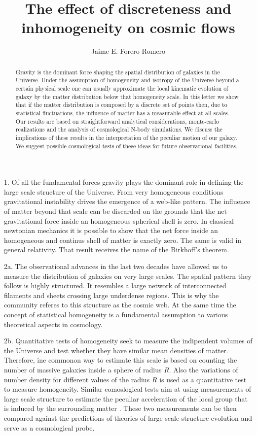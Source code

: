 \documentclass{article}
\title{The effect of discreteness and inhomogeneity on cosmic flows}
\author{Jaime E. Forero-Romero}
\begin{document}
\maketitle
\begin{abstract}

Gravity is the dominant force shaping the spatial distribution of galaxies in
the Universe. Under the assumption of homogeneity and isotropy of the Universe
beyond a certain physical scale one can usually approximate the local
kinematic evolution of galaxy by the matter distribution below that
homogeneity scale. In this letter we show that if the matter
distribution is composed by a discrete set of points then, due to
statistical fluctuations, the influence of matter has a measurable
effect at all scales. Our results are based on straightforward
analytical considerations, monte-carlo realizations and the analysis
of cosmological N-body simulations. We discuss the implications of
these results in the interpretation of the peculiar motion of our
galaxy. We suggest possible cosmological tests of these ideas for
future observational facilities. 



\end{abstract}

1. Of all the fundamental forces gravity plays the dominant role in
defining the large scale structure of the Universe. From very
homogeneous conditions gravitational instability drives the emergence
of a web-like pattern. The influence of
matter beyond that scale can be discarded on the grounds that
the net gravitational force inside an homogeneous spherical
shell is zero. In classical newtonian mechanics it is possible to show
that the net force inside an homogeneous and continus shell of matter
is exactly zero. The same is valid in general relativity. That result
receives the name of the Birkhoff's theorem. 

2a. The observational advances in the last two decades have allowed us
to measure the distribution of galaxies on very large scales. The
spatial pattern they follow is highly structured. It resembles a
large network of interconnected filaments and sheets crossing large
underdense regions.  This is why the community referes to this
structure as the cosmic web. At the same time the concept of
statistical homogeneity is a fundamental assumption to various
theoretical aspects in cosmology. 

2b. Quantitative tests of homogeneity seek to measure the indipendent
volumes of the Universe and test whether they have similar mean
densities of matter. Therefore, ine commonon way to estimate this
scale is based on counting the number of massive galaxies inside a
sphere of radius $R$. Also the variations of number density for
different values of the radius $R$ is used as a quantitative test to
measure homogeneity\cite{2005ApJ...624...54H}. 
Similar comoslogical tests aim at using measurements of large scale
structure to estimate the peculiar acceleration of the local group
that is induced by the surrounding matter
\cite{Gibelyou2012,Bilicki2012}. These two measurements can be then
compared against the predictions of theories of large scale structure
evolution and serve as a cosmological probe. 
\end{document}
